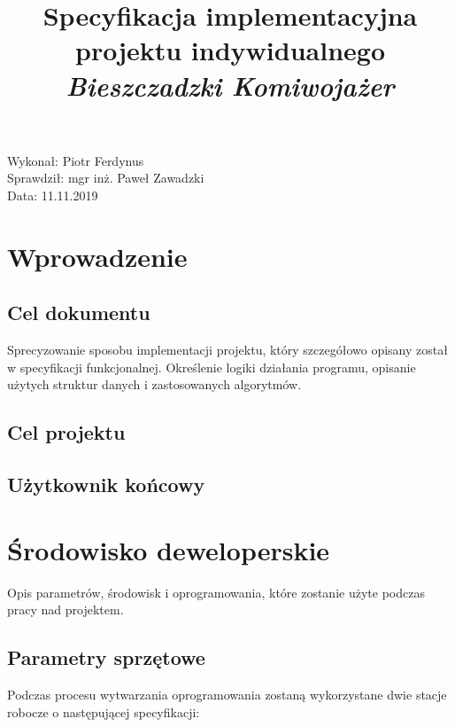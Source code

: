 \documentclass{article}
\title{Specyfikacja implementacyjna projektu indywidualnego \textit{Bieszczadzki Komiwojażer}}
\begin{document}
\begin{titlepage}
\makeatletter
\noindent
\vspace{25pt}
\begin{center}
\LARGE \textsc{\@title}
\end{center}
\makeatother
\vspace{300pt}
\begin{flushright}
\noindent Wykonał: Piotr Ferdynus\\
Sprawdził: mgr inż. Paweł Zawadzki\\
Data: 11.11.2019\\
\end{flushright}


\thispagestyle{empty}
\end{titlepage}

\lhead{}
\cfoot{\thepage \hspace{1pt} / \pageref{LastPage}}
\setcounter{page}{2}

\section{Wprowadzenie}

\subsection{Cel dokumentu}
Sprecyzowanie sposobu implementacji projektu, który szczegółowo opisany został w specyfikacji funkcjonalnej. Określenie logiki działania programu, opisanie użytych struktur danych i zastosowanych algorytmów.

\subsection{Cel projektu}

\subsection{Użytkownik końcowy}

\section{Środowisko deweloperskie}
Opis parametrów, środowisk i oprogramowania, które zostanie użyte podczas pracy nad projektem.

\subsection{Parametry sprzętowe}
Podczas procesu wytwarzania oprogramowania zostaną wykorzystane dwie stacje robocze o następującej specyfikacji:
\end{document}
